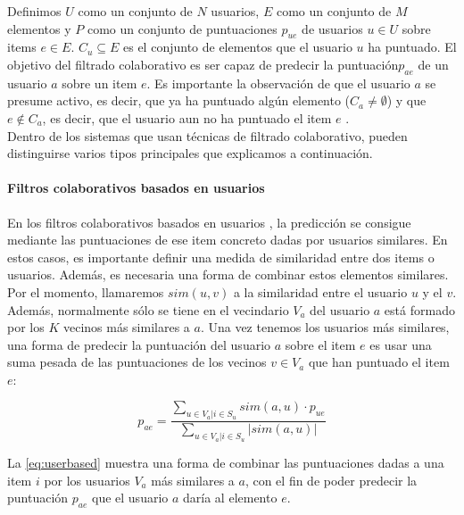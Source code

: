 Definimos $U$ como un conjunto de $N$ usuarios, $E$ como un conjunto de $M$ elementos y $P$ como un conjunto de puntuaciones $p_{ue}$ de usuarios $u\in U$ sobre items $e\in E$. $C_u \subseteq E$ es el conjunto de elementos que el usuario $u$ ha puntuado. El objetivo del filtrado colaborativo es ser capaz de predecir la puntuación$p_{ae}$ de un usuario $a$ sobre un item $e$. Es importante la observación de que el usuario $a$ se presume activo, es decir, que ya ha puntuado algún elemento ($C_a \neq \emptyset$) y que $e \notin C_a$, es decir, que el usuario aun no ha puntuado el item $e$ .\\

Dentro de los sistemas que usan técnicas de filtrado colaborativo, pueden distinguirse varios tipos principales que explicamos a continuación.

\paragraph{Filtros colaborativos basados en usuarios}

En los filtros colaborativos basados en usuarios \cite{resnick}, la predicción se consigue mediante las puntuaciones de ese item concreto dadas por usuarios similares. En estos casos, es importante definir una medida de similaridad entre dos items o usuarios. Además, es necesaria una forma de combinar estos elementos similares. \\

Por el momento, llamaremos $sim\left(u, v\right)$ a la similaridad entre el usuario $u$ y el $v$. Además, normalmente sólo se tiene en el vecindario $V_a$ del usuario $a$ está formado por los $K$ vecinos más similares a $a$. Una vez tenemos los usuarios más similares, una forma de predecir la puntuación del usuario $a$ sobre el item $e$ es usar una suma pesada de las puntuaciones de los vecinos $v\in V_a$ que han puntuado el item $e$:

\begin{equation}
    p_{ae} = \frac{\sum_{u\in V_a | i \in S_u}{sim\left(a, u\right)\cdot p_{ue}}}{\sum_{u\in V_a | i \in S_u}{|sim\left(a, u\right)|}}
\label{eq:userbased}
\end{equation}

La \autoref{eq:userbased} muestra una forma de combinar las puntuaciones dadas a una item $i$ por los usuarios $V_a$ más similares a $a$, con el fin de poder predecir la puntuación $p_{ae}$ que el usuario $a$ daría al elemento $e$.\\

